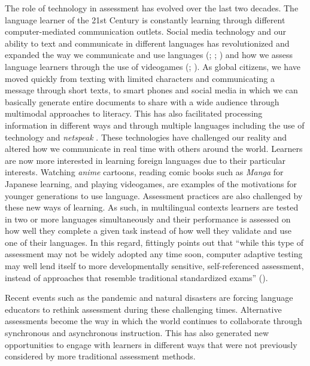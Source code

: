 \documentclass[output=paper]{langscibook}
\begin{document}
  The role of technology in assessment has evolved over the last two decades. The language learner of the 21st Century is constantly learning through different computer-mediated communication outlets. Social media technology and our ability to text and communicate in different languages has revolutionized and expanded the way we communicate and use languages (\citealt{ThorneJakonen2021}; \citealt{Crystal2009}; \citealt{Thorne2008}) and how we assess language learners through the use of videogames (\citealt{ThorneLu2012}; \citealt{Gee2014}). As global citizens, we have moved quickly from texting with limited characters and communicating a message through short texts, to smart phones and social media in which we can basically generate entire documents to share with a wide audience through multimodal approaches to literacy. This has also facilitated processing information in different ways and through multiple languages including the use of technology and \textit{netspeak} \citep{Crystal2009}. These technologies have challenged our reality and altered how we communicate in real time with others around the world. Learners are now more interested in learning foreign languages due to their particular interests. Watching \textit{anime} cartoons, reading comic books such as \textit{Manga} for Japanese learning, and playing videogames, are examples of the motivations for younger generations to use language. Assessment practices are also challenged by these new ways of learning. As such, in multilingual contexts learners are tested in two or more languages simultaneously and their performance is assessed on how well they complete a given task instead of how well they validate and use one of their languages. In this regard, \citet{Larsen-Freeman2018} fittingly points out that “while this type of assessment may not be widely adopted any time soon, computer adaptive testing may well lend itself to more developmentally sensitive, self-referenced assessment, instead of approaches that resemble traditional standardized exams” (\citeyear[63]{Larsen-Freeman2018}).

Recent events such as the pandemic and natural disasters are forcing language educators to rethink assessment during these challenging times. Alternative assessments become the way in which the world continues to collaborate through synchronous and asynchronous instruction. This has also generated new opportunities to engage with learners in different ways that were not previously considered by more traditional assessment methods.
\end{document}
